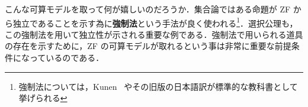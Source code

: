 \documentclass[a4j,xelatex,ja=standard]{ltjsarticle}
\begin{document}
こんな可算モデルを取って何が嬉しいのだろうか．集合論ではある命題が ZF から独立であることを示す為に{\bfseries 強制法}という手法が良く使われる\footnote{強制法については，Kunen~\cite{Kunen:2011} やその旧版の日本語訳が標準的な教科書として挙げられる}．選択公理も，この強制法を用いて独立性が示される重要な例である．強制法で用いられる道具の存在を示すために，ZF の可算モデルが取れるという事は非常に重要な前提条件になっているのである．

\nocite{Tanaka:2005,Komori,alg-d,Kunen:2011,Takeuti:2001}
\nocite{alg_d:2013,Keisler,Goldblatt,Awodey,Arai,Saito,Tanaka,Tsuboi,Eda}
\printbibliography
\end{document}
